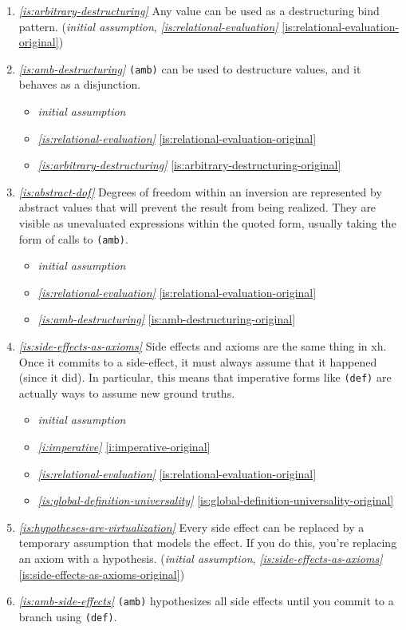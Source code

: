 \documentclass{report}
\makeatletter
\newcommand*{\Label}[2]{%
  \@bsphack
  \begingroup
    \label{#1-original}%
    \def\@currentlabel{#2}%
    \label{#1}%
  \endgroup
  \@esphack
}
\newcommand{\initial}{{\em initial assumption}}
\newcommand{\refboth}[1]{{\em \ref{#1}} \ref{#1-original}}
\makeatother
\begin{document}
\begin{enumerate}
\item{}\Label{is:arbitrary-destructuring}{xhs.destructuring}{\em\ref{is:arbitrary-destructuring}}
  Any value can be used as a destructuring bind pattern.
(\initial, \refboth{is:relational-evaluation})
\item{}\Label{is:amb-destructuring}{xhs.ambdestructure}{\em\ref{is:amb-destructuring}}
  \verb|(amb)| can be used to destructure values, and it behaves as a
  disjunction.
\begin{itemize}
\item \initial
\item \refboth{is:relational-evaluation}
\item \refboth{is:arbitrary-destructuring}
\end{itemize}
\item{}\Label{is:abstract-dof}{xhs.dof}{\em\ref{is:abstract-dof}}
  Degrees of freedom within an inversion are represented by abstract values
  that will prevent the result from being realized. They are visible as
  unevaluated expressions within the quoted form, usually taking the form
  of calls to \verb|(amb)|.
\begin{itemize}
\item \initial
\item \refboth{is:relational-evaluation}
\item \refboth{is:amb-destructuring}
\end{itemize}

\item{}\Label{is:side-effects-as-axioms}{xhs.se-axioms}{\em\ref{is:side-effects-as-axioms}}
  Side effects and axioms are the same thing in xh. Once it commits to a
  side-effect, it must always assume that it happened (since it did). In
  particular, this means that imperative forms like {\tt (def)} are
  actually ways to assume new ground truths.
\begin{itemize}
\item \initial
\item \refboth{i:imperative}
\item \refboth{is:relational-evaluation}
\item \refboth{is:global-definition-universality}
\end{itemize}
\item{}\Label{is:hypotheses-are-virtualization}{xhs.virtualization}{\em\ref{is:hypotheses-are-virtualization}}
  Every side effect can be replaced by a temporary assumption that models
  the effect. If you do this, you're replacing an axiom with a hypothesis.
(\initial, \refboth{is:side-effects-as-axioms})
\item{}\Label{is:amb-side-effects}{xhs.amb-se}{\em\ref{is:amb-side-effects}}
  \verb|(amb)| hypothesizes all side effects until you commit to a branch
  using \verb|(def)|.


\end{enumerate}
\end{document}
